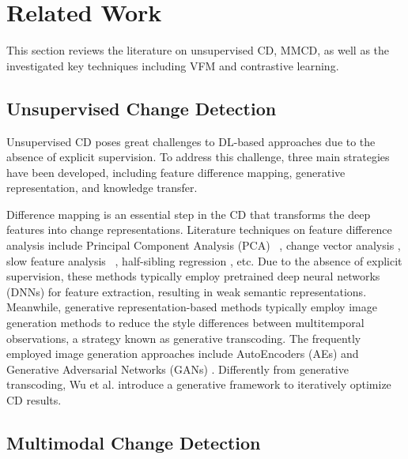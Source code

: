 \section{Related Work}
\label{sc2}

This section reviews the literature on unsupervised CD, MMCD, as well as the investigated key techniques including VFM and contrastive learning.

\subsection{Unsupervised Change Detection}

Unsupervised CD poses great challenges to DL-based approaches due to the absence of explicit supervision. To address this challenge, three main strategies have been developed, including feature difference mapping, generative representation, and knowledge transfer.

Difference mapping is an essential step in the CD that transforms the deep features into change representations. Literature techniques on feature difference analysis include Principal Component Analysis (PCA) ~\cite{Bruzzone2000diff, Gao2016Automatic}, change vector analysis \cite{saha2019unsupervised, wu2021unsupervised}, slow feature analysis ~\cite{Wu2014Slow, Du2019Unsupervised}, half-sibling regression \cite{Kondmann2022Spatial}, etc. Due to the absence of explicit supervision, these methods typically employ pretrained deep neural networks (DNNs) for feature extraction, resulting in weak semantic representations. Meanwhile, generative representation-based methods typically employ image generation methods to reduce the style differences between multitemporal observations, a strategy known as generative transcoding. The frequently employed image generation approaches include AutoEncoders (AEs) \cite{Chen2022Unsupervised} and Generative Adversarial Networks (GANs) \cite{noh2022unsupervised}. Differently from generative transcoding, Wu et al. \cite{wu2023fully} introduce a generative framework to iteratively optimize CD results. 

\subsection{Multimodal Change Detection}

